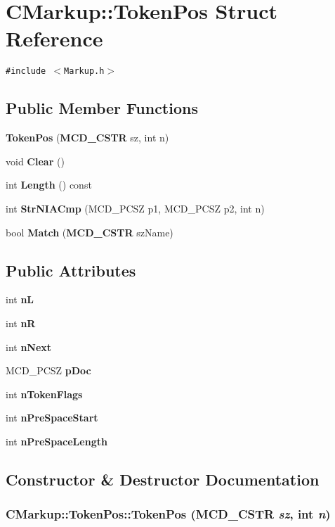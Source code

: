 \section{CMarkup::TokenPos Struct Reference}
\label{structCMarkup_1_1TokenPos}
{\tt \#include $<$Markup.h$>$}

\subsection*{Public Member Functions}
\begin{CompactItemize}
\item 
{\bf TokenPos} ({\bf MCD\_\-CSTR} sz, int n)
\item 
void {\bf Clear} ()
\item 
int {\bf Length} () const 
\item 
int {\bf StrNIACmp} (MCD\_\-PCSZ p1, MCD\_\-PCSZ p2, int n)
\item 
bool {\bf Match} ({\bf MCD\_\-CSTR} szName)
\end{CompactItemize}
\subsection*{Public Attributes}
\begin{CompactItemize}
\item 
int {\bf nL}
\item 
int {\bf nR}
\item 
int {\bf nNext}
\item 
MCD\_\-PCSZ {\bf pDoc}
\item 
int {\bf nTokenFlags}
\item 
int {\bf nPreSpaceStart}
\item 
int {\bf nPreSpaceLength}
\end{CompactItemize}


\subsection{Constructor \& Destructor Documentation}
\subsubsection[TokenPos]{\setlength{\rightskip}{0pt plus 5cm}CMarkup::TokenPos::TokenPos ({\bf MCD\_\-CSTR} {\em sz}, \/  int {\em n})\hspace{0.3cm}{\tt  [inline]}}\label{structCMarkup_1_1TokenPos_797a3f5d9664c52971cf210166c3636a}




